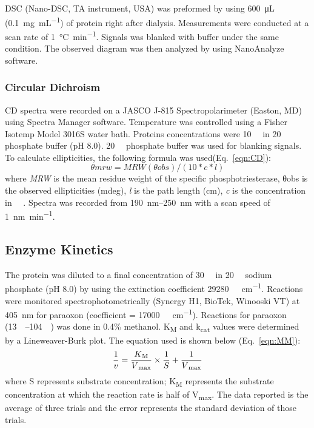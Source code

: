 \begin{refsection}
DSC (Nano-DSC, TA instrument, USA) was preformed by using \SI{600}{\micro\L}
(\SI{0.1}{\mg\per\mL}) of protein right after dialysis. Measurements were
conducted at a scan rate of \SI{1}{\celsius\per\minute}. Signals was blanked with
buffer under the same condition.  The observed diagram was then analyzed by
using NanoAnalyze software.

\subsubsection{Circular Dichroism}
\label{sec:cd}

CD spectra were recorded on a JASCO J-815 Spectropolarimeter (Easton, MD) using
Spectra Manager software. Temperature was controlled using a Fisher Isotemp
Model 3016S water bath. Proteins concentrations were \SI{10}{\micro\Molar} in
\SI{20}{\milli\Molar} phosphate buffer (pH 8.0). \SI{20}{\milli\Molar}
phosphate buffer was used for blanking signals. To calculate ellipticities, the
following formula was used(Eq.~\ref{eqn:CD}): 
\begin{equation}
    θmrw = MRW(θobs) / (10 * c * l) 
    \label{eqn:CD}
\end{equation}
where \emph{MRW} is the mean residue weight of the specific phosphotriesterase,
θobs is the observed ellipticities (mdeg), \emph{l} is the path length (cm),
\emph{c} is the concentration in \SI{}{\micro\Molar}. Spectra was recorded from
\SIrange{190}{250}{\nm} with a scan speed of \SI{1}{\nano\meter\per\minute}.

\subsection{Enzyme Kinetics}
\label{sec:kinetics}

The protein was diluted to a final concentration of \SI{30}{\nano\Molar} in
\SI{20}{\milli\Molar} sodium phosphate (pH 8.0) by using the extinction
coefficient \SI{29280}{\per\Molar\per\cm}. Reactions were monitored
spectrophotometrically (Synergy H1, BioTek, Winooski VT) at \SI{405}{\nm} for
paraoxon (coefficient = \SI{17000}{\per\Molar\per\cm}).  Reactions for paraoxon
(\SIrange{13}{104}{\micro\Molar}) was done in 0.4\% methanol.
K\textsubscript{M} and k\textsubscript{cat} values were determined by a
Lineweaver-Burk plot.\cite{Baker2011b} The equation used is shown below
(Eq.~\ref{eqn:MM}): 
\begin{equation} 
    \frac{1}{v} =
    \frac{K\textsubscript{M}}{V\textsubscript{max}}\times\frac{1}{S} +
    \frac{1}{V\textsubscript{max}} 
    \label{eqn:MM}
\end{equation}
where S represents substrate concentration; K\textsubscript{M} represents the
substrate concentration at which the reaction rate is half of
V\textsubscript{max}. The data reported is the average of three trials and the
error represents the standard deviation of those trials.


\end{refsection}
